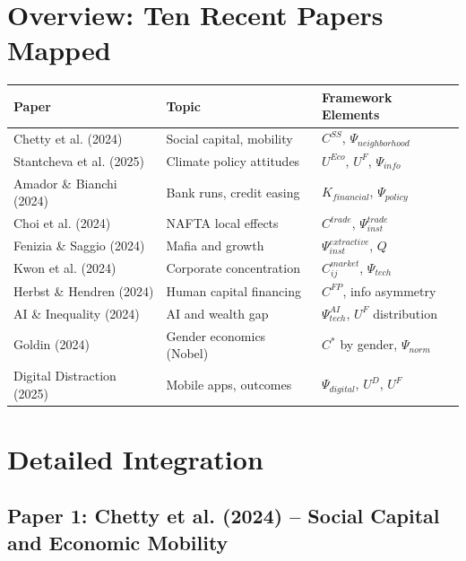 \section{Overview: Ten Recent Papers Mapped}
\label{sec:J-overview}

\begin{center}
\renewcommand{\arraystretch}{1.15}
\small
\begin{tabular}{lll}
\hline
\textbf{Paper} & \textbf{Topic} & \textbf{Framework Elements} \\
\hline
Chetty et al. (2024) & Social capital, mobility & $C^{SS}$, $\Psi_{neighborhood}$ \\
Stantcheva et al. (2025) & Climate policy attitudes & $U^{Eco}$, $U^F$, $\Psi_{info}$ \\
Amador \& Bianchi (2024) & Bank runs, credit easing & $K_{financial}$, $\Psi_{policy}$ \\
Choi et al. (2024) & NAFTA local effects & $C^{trade}$, $\Psi_{inst}^{trade}$ \\
Fenizia \& Saggio (2024) & Mafia and growth & $\Psi_{inst}^{extractive}$, $Q$ \\
Kwon et al. (2024) & Corporate concentration & $C_{ij}^{market}$, $\Psi_{tech}$ \\
Herbst \& Hendren (2024) & Human capital financing & $C^{FP}$, info asymmetry \\
AI \& Inequality (2024) & AI and wealth gap & $\Psi_{tech}^{AI}$, $U^F$ distribution \\
Goldin (2024) & Gender economics (Nobel) & $C^*$ by gender, $\Psi_{norm}$ \\
Digital Distraction (2025) & Mobile apps, outcomes & $\Psi_{digital}$, $U^D$, $U^F$ \\
\hline
\end{tabular}
\end{center}


\section{Detailed Integration}
\label{sec:J-detailed}

\subsection{Paper 1: Chetty et al. (2024) -- Social Capital and Economic Mobility}

